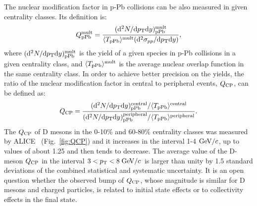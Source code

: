 The nuclear modification factor in p-Pb collisions can be also measured in given centrality classes.
Its definition is:
\begin{equation}
Q_{\rm pPb}^{\rm mult} = \frac{({\rm d}^2 N/{\rm d} p_{\rm T} {\rm d} y)^{\rm mult}_{\rm pPb}}{\langle T_{\rm pPb} \rangle ^{\rm mult}({\rm d}^2 \sigma_{pp}/{\rm d} p_{\rm T} {\rm d} y)},
\end{equation}
where $({\rm d}^2 N/{\rm d} p_{\rm T} {\rm d} y)^{\rm mult}_{\rm pPb}$ 
is the yield of a given species in p-Pb collisions 
in a given centrality class, and $\langle T_{\rm pPb} \rangle ^{\rm mult}$ is the average nuclear 
overlap function in the same centrality class.
In order to achieve better precision on the yields, the ratio of the nuclear 
modification factor in central to peripheral events, $Q_{\rm CP}$, 
can be defined as:
\begin{equation}
Q_{\rm CP} = \frac{({\rm d}^2 N/{\rm d} p_{\rm T} {\rm d} y)^{\rm central}_{\rm pPb}/ \langle T_{\rm pPb} \rangle^{\rm central}}{({\rm d}^2 N/{\rm d} p_{\rm T} {\rm d} y)^{\rm peripheral}_{\rm pPb}/ \langle T_{\rm pPb} \rangle^{\rm peripheral}}.
\label{eq:QCP}
\end{equation}
The $Q_{\rm CP}$ of D mesons in the 0-10\% and 60-80\% 
centrality classes was measured by 
ALICE~\cite{ALICEPAS2017008} (Fig.~\ref{fig:QCP}) 
and it increases in the interval 1-4 $\mathrm{GeV}/c$, 
up to values of about 1.25 and then tends to decrease. The 
average value of the D-meson $Q_{\rm CP}$ 
in the interval $3 < p_{\rm T} < 8 \; \mathrm{GeV}/c$ is larger than unity by 1.5 
standard deviations of the combined statistical and systematic uncertainty.
It is an open question whether the observed bump of $Q_{\rm CP}$, whose magnitude is similar 
for D mesons and charged particles, is related to initial state effects 
or to collectivity effects in the final state.

